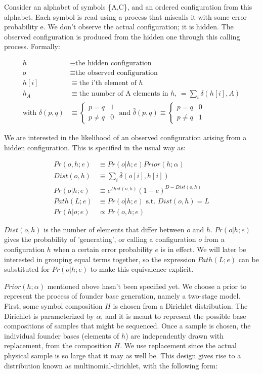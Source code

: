 \documentclass{article}
\begin{document}
Consider an alphabet of symbols \{A,C\}, and an ordered configuration
from this alphabet. Each symbol is read using a process that miscalls
it with some error probability e.  We don't observe the actual
configuration; it is hidden.  The observed configuration is produced
from the hidden one through this calling process.  Formally:

\begin{align*}
h & \equiv \text{the hidden configuration} \\
o & \equiv \text{the observed configuration} \\
h[i] & \equiv \text{the i'th element of } h \\
h_A & \equiv \text{the number of A elements in } h \text{, }
= \sum_i \delta(h[i],A) \\
\text{with }\delta(p,q) & \equiv
\begin{cases}
  p = q & 1 \\
  p \neq q & 0
\end{cases}
\text{ and }
\bar{\delta}(p,q) \equiv
\begin{cases}
  p = q & 0 \\
  p \neq q & 1
\end{cases}
\end{align*}

We are interested in the likelihood of an observed configuration
arising from a hidden configuration.  This is specified in the usual
way as:

\begin{align}
  Pr(o,h;e) & \equiv Pr(o|h;e)Prior(h;\alpha) \\[2ex]
  Dist(o,h) & \equiv \sum_i \bar{\delta}(o[i],h[i]) \\[2ex]
  Pr(o|h;e) & \equiv e^{Dist(o,h)}(1-e)^{D-Dist(o,h)} \\[2ex]
  Path(L;e) & \equiv Pr(o|h;e) \text{ s.t. } Dist(o,h) = L\\[2ex]
  Pr(h|o;e) & \propto Pr(o,h;e) \nonumber
\end{align}

$Dist(o,h)$ is the number of elements that differ between $o$ and $h$.
$Pr(o|h;e)$ gives the probability of 'generating', or calling a
configuration $o$ from a configuration $h$ when a certain error
probability $e$ is in effect. We will later be interested in grouping
equal terms together, so the expression $Path(L;e)$ can be substituted
for $Pr(o|h;e)$ to make this equivalence explicit.

$Prior(h;\alpha)$ mentioned above hasn't been specified yet.  We
choose a prior to represent the process of founder base generation,
namely a two-stage model.  First, some symbol composition $H$ is
chosen from a Dirichlet distribution.  The Dirichlet is parameterized
by $\alpha$, and it is meant to represent the possible base
compositions of samples that might be sequenced.  Once a sample is
chosen, the individual founder bases (elements of $h$) are
independently drawn with replacement, from the composition $H$.  We
use replacement since the actual physical sample is so large that it
may as well be. This design gives rise to a distribution known as
multinomial-dirichlet, with the following form:
\end{document}
